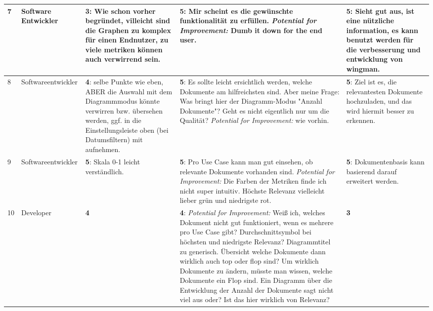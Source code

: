 \documentclass[
	english,
	ruledheaders=section,%
	class=report,%
	thesis={type=bachelor},%
	accentcolor=1b,%
	custommargins=true,%
	marginpar=false,%
	parskip=half-,%
	fontsize=11pt,%
	DIV=14,
]{tudapub}
\begin{document}
\begin{longtable}{l >{\RaggedRight}p{3cm} >{\RaggedRight}p{3.5cm} >{\RaggedRight}p{3.5cm} >{\RaggedRight}p{3.5cm}}
    \midrule
    7 & Software Entwickler & \textbf{3}: Wie schon vorher begründet, villeicht sind die Graphen zu komplex für einen Endnutzer, zu viele metriken können auch verwirrend sein. & \textbf{5}: Mir scheint es die gewünschte funktionalität zu erfüllen. \textit{Potential for Improvement:} Dumb it down for the end user. & \textbf{5}: Sieht gut aus, ist eine nützliche information, es kann benutzt werden für die verbesserung und entwicklung von wingman. \\
    \midrule
    8 & Softwareentwickler & \textbf{4}: selbe Punkte wie eben, ABER die Auswahl mit dem Diagrammmodus könnte verwirren bzw. übersehen werden, ggf. in die Einstellungsleiste oben (bei Datumsfiltern) mit aufnehmen. & \textbf{5}: Es sollte leicht ersichtlich werden, welche Dokumente am hilfreichsten sind. Aber meine Frage: Was bringt hier der Diagramm-Modus "Anzahl Dokumente"? Geht es nicht eigentlich nur um die Qualität? \textit{Potential for Improvement:} wie vorhin. & \textbf{5}: Ziel ist es, die relevantesten Dokumente hochzuladen, und das wird hiermit besser zu erkennen. \\
    \midrule
    9 & Softwareentwickler & \textbf{5}: Skala 0-1 leicht verständlich. & \textbf{5}: Pro Use Case kann man gut einsehen, ob relevante Dokumente vorhanden sind. \textit{Potential for Improvement:} Die Farben der Metriken finde ich nicht super intuitiv. Höchste Relevanz vielleicht lieber grün und niedrigste rot. & \textbf{5}: Dokumentenbasis kann basierend darauf erweitert werden. \\
    \midrule
    10 & Developer & \textbf{4} & \textbf{4}: \textit{Potential for Improvement:} Weiß ich, welches Dokument nicht gut funktioniert, wenn es mehrere pro Use Case gibt? Durchschnittsymbol bei höchsten und niedrigste Relevanz? Diagrammtitel zu generisch. Übersicht welche Dokumente dann wirklich auch top oder flop sind? Um wirklich Dokumente zu ändern, müsste man wissen, welche Dokumente ein Flop sind. Ein Diagramm über die Entwicklung der Anzahl der Dokumente sagt nicht viel aus oder? Ist das hier wirklich von Relevanz? & \textbf{3} \\
\end{longtable}

\clearpage
\end{document}
